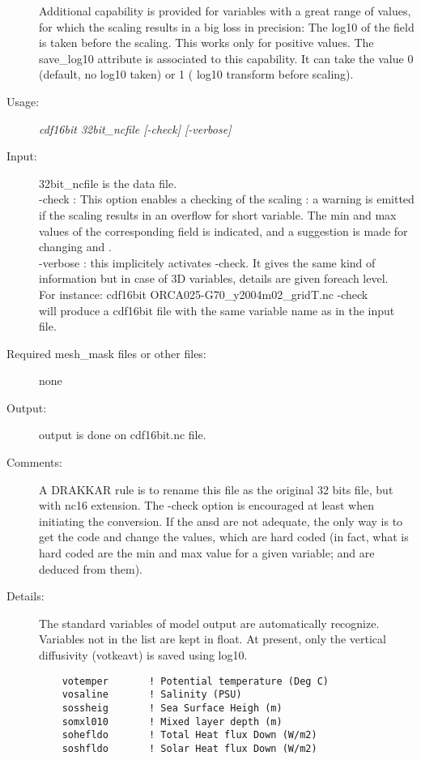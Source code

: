 \documentclass[a4paper,11pt]{article}
\begin{document}
\begin{description}
   Additional capability is provided for variables with a great range of values, for which the scaling results in a big loss in precision: The
log10 of the field is taken before the scaling. This works only for positive values. The save\_log10 attribute 
is associated to this capability. It can take the value 0 (default, no log10 taken) or 1 ( log10 transform before scaling).
\item[Usage:] {\em cdf16bit 32\-bit\_ncfile  [-check] [-verbose] }
\item[Input:]  32\-bit\_ncfile is the data file.\\
      -check : This option enables a checking of the scaling : a warning is emitted if the scaling results in an overflow for short variable. The
               min and max values of the corresponding field is indicated, and a suggestion is made for changing \SF and \ao. \\
      -verbose : this implicitely activates -check. It gives the same kind of information but in case of 3D variables, details are given foreach
                 level. \\
For instance: cdf16bit ORCA025-G70\_y2004m02\_gridT.nc -check  \\
will produce a cdf16bit file with the same variable name as in the input file.
\item[Required mesh\_mask files or other files:] none
\item[Output:] output is done on cdf16bit.nc file.
\item[Comments:]  A DRAKKAR rule is to rename this file as the original 32 bits file, but with nc16 extension. The -check option is encouraged
      at least when initiating the conversion. If the \SF ansd \ao are not adequate, the only way is to get the code and change the values,
      which are hard coded (in fact, what is hard coded are the min and max value for a given variable; \SF and \ao are deduced from them).
\item[Details:] The standard variables of model output are automatically recognize. Variables not in the list are kept in float. At present,
         only the vertical diffusivity (votkeavt) is saved using log10.
\begin{small}
  \begin{verbatim}
    votemper       ! Potential temperature (Deg C)
    vosaline       ! Salinity (PSU)
    sossheig       ! Sea Surface Heigh (m)
    somxl010       ! Mixed layer depth (m)
    sohefldo       ! Total Heat flux Down (W/m2)
    soshfldo       ! Solar Heat flux Down (W/m2)

\end{verbatim}
\end{small}
\end{description}
\end{document}
